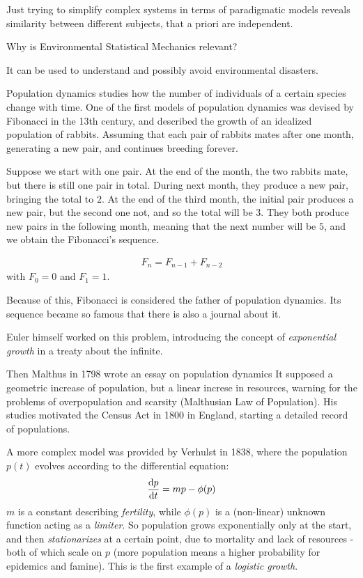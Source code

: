 \documentclass[../../main.tex]{subfiles}
\begin{document}
Just trying to simplify complex systems in terms of paradigmatic models reveals similarity between different subjects, that a priori are independent.

Why is Environmental Statistical Mechanics relevant?

It can be used to understand and possibly avoid environmental disasters. 



Population dynamics studies how the number of individuals of a certain species change with time. 
One of the first models of population dynamics was devised by Fibonacci in the 13th century, and described the growth of an idealized population of rabbits. Assuming that each pair of rabbits mates after one month, generating a new pair, and continues breeding forever.

Suppose we start with one pair. At the end of the month, the two rabbits mate, but there is still one pair in total.
During next month, they produce a new pair, bringing the total to $2$. At the end of the third month, the initial pair produces a new pair, but the second one not, and so the total will be $3$. They both produce new pairs in the following month, meaning that the next number will be $5$, and we obtain the Fibonacci's sequence.

\begin{align*}
    F_n = F_{n-1} + F_{n-2}
\end{align*}
with $F_0 = 0$ and $F_1 = 1$. 

Because of this, Fibonacci is considered the father of population dynamics. Its sequence became so famous that there is also a journal about it. %


Euler himself worked on this problem, introducing the concept of \textit{exponential growth} in a treaty about the infinite. %

Then Malthus in 1798 wrote an essay on population dynamics %
It supposed a geometric increase of population, but a linear increse in resources, warning for the problems of overpopulation and scarsity (Malthusian Law of Population).
His studies motivated the Census Act in 1800 in England, starting a detailed record of populations. 

A more complex model was provided by Verhulst in 1838, where the population $p(t)$ evolves according to the differential equation:
\begin{align*}
    \dv{p}{t} = mp - \phi(p)
\end{align*}
$m$ is a constant describing \textit{fertility}, while $\phi(p)$ is a (non-linear) unknown function acting as a \textit{limiter}. So population grows exponentially only at the start, and then \textit{stationarizes} at a certain point, due to mortality and lack of resources - both of which scale on $p$ (more population means a higher probability for epidemics and famine). This is the first example of a \textit{logistic growth}.
\end{document}
